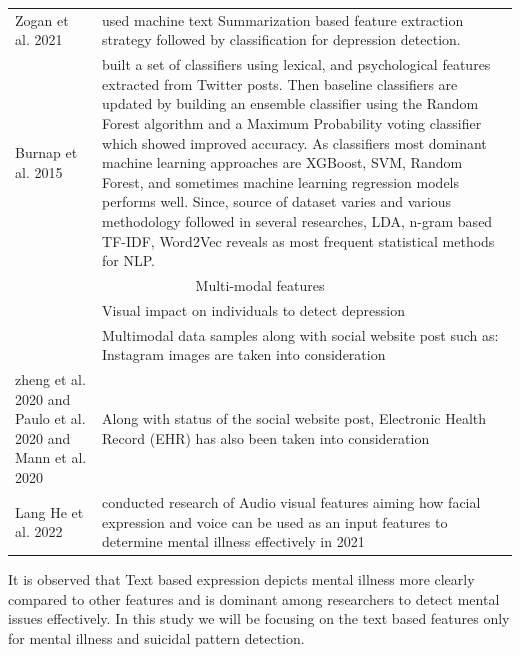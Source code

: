 \documentclass[sn-mathphys,Numbered]{sn-jnl}%
\theoremstyle{thmstyleone}%
\theoremstyle{thmstyletwo}%
\theoremstyle{thmstylethree}%
\begin{document}
\begin{table}[h!]
\begin{center}
\begin{flushleft}
\begin{tabular}{|p{2cm}|p{10cm}|}
Zogan et al. 2021 \cite{zogan2021depressionnet}   & used machine text Summarization based feature extraction strategy followed by classification for depression detection.\\
 
Burnap et al. 2015  \cite{burnap2015machine} & built a set of classifiers using lexical, and psychological features extracted from Twitter posts. Then baseline classifiers are updated by building an ensemble classifier using the Random Forest algorithm and a Maximum Probability voting classifier which showed improved accuracy. As classifiers most dominant machine learning approaches are  XGBoost, SVM, Random Forest, and sometimes machine learning regression models performs well. Since, source of dataset varies and various methodology followed in several researches, LDA, n-gram based TF-IDF, Word2Vec reveals as most frequent statistical methods for NLP. \\

\multicolumn{2}{c}{Multi-modal features} \\
\cite{ye2021multi} & Visual impact on individuals to detect depression \\
\cite{castillo2020suicide, chancellor2020methods} & Multimodal data samples along with social website post such as: Instagram images are taken into consideration \\
zheng et al. 2020 \cite{zheng2020development} and Paulo et al. 2020 and Mann et al. 2020 \cite{mann2020see} & Along with status of the social website post, Electronic Health Record (EHR) has also been taken into consideration \\
Lang He et al. 2022 \cite{he2022deep} & conducted research of Audio visual features  aiming how facial expression and voice can be used as an input features to determine mental illness effectively in 2021 \\



\bottomrule
\end{tabular}
\end{flushleft}
\end{center}
\end{table}
It is observed that Text based expression depicts mental illness more clearly compared to other features and is dominant among researchers to detect mental issues effectively. In this study we will be focusing on the text based features only for mental illness and suicidal pattern detection. 
  
\end{document}
